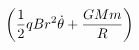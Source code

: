 \documentclass[preview]{standalone}
\begin{document}
\begin{align*}
\left(\frac12qBr^2\dot{\theta}+{GMm\over R}\right)
\end{align*}
\end{document}
